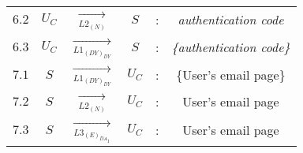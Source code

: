 \begin{center}
\begin{tabular}{ p{.25cm} c c c c c }
$6.2$ & $U_C$ & $\xrightarrow[L2_{(N)}]{}$ & $S$ & : & \textit{authentication code} \\ 

$6.3$ & $U_C$ & $\xrightarrow[L1_{(DY)_{DY}}]{}$ & $S$ & : & \textit{\{authentication code\}} \\ 


$7.1$ & $S$ & $\xrightarrow[L1_{(DY)_{DY}}]{}$ & $U_C$ & : & \{User's email page\} \\ 

$7.2$ & $S$ & $\xrightarrow[L2_{(N)}]{}$ & $U_C$ & : & User's email page \\ 

$7.3$ & $S$ & $\xrightarrow[L3_{{(E)}_{{DA}_1}}]{}$ & $U_C$ & : & User's email page \\ 

\end{tabular} 
\end{center} 
